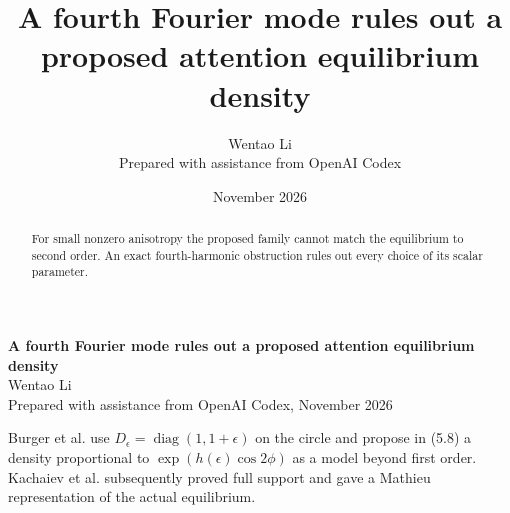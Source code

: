 \documentclass[10pt]{article}
\title{A fourth Fourier mode rules out a proposed attention equilibrium density}
\author{Wentao Li\\{\small Prepared with assistance from OpenAI Codex}}
\date{November 2026}
\begin{document}
\begin{center}{\Large\bfseries A fourth Fourier mode rules out a proposed attention equilibrium density}\\[3pt]Wentao Li\\{\small Prepared with assistance from OpenAI Codex, November 2026}\end{center}
\begin{abstract}
For small nonzero anisotropy the proposed family cannot match the equilibrium to second order. An exact fourth-harmonic obstruction rules out every choice of its scalar parameter.
\end{abstract}
Burger et al. use $D_\epsilon=\operatorname{diag}(1,1+\epsilon)$ on the circle and propose in (5.8) a density proportional to $\exp(h(\epsilon)\cos 2\phi)$ as a model beyond first order. Kachaiev et al. subsequently proved full support and gave a Mathieu representation of the actual equilibrium.
\end{document}
